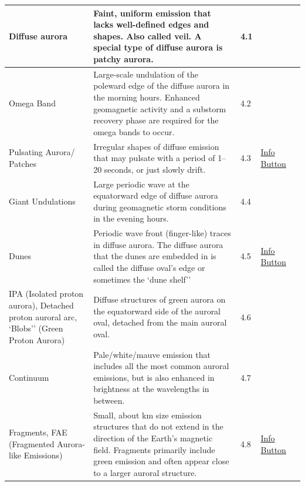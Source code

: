 \documentclass{article}
\begin{document}
\begin{longtable}{|p{1.5cm}|p{6.5cm}|p{1cm}|p{1.75cm}|p{1.8cm}|}
Diffuse aurora & Faint, uniform emission that lacks well-defined edges and shapes. Also called veil. A special type of diffuse aurora is patchy aurora. & 4.1 &  & \textcite{Nishimura2020} \\
\hline
Omega Band & Large-scale undulation of the poleward edge of the diffuse aurora in the morning hours. Enhanced geomagnetic activity and a substorm recovery phase are required for the omega bands to occur. & 4.2 &  & \textcite{Sato2017} \\
\hline
Pulsating Aurora/ Patches & Irregular shapes of diffuse emission that may pulsate with a period of 1--20 seconds, or just slowly drift. & 4.3 & \href{https://www.taivaanvahti.fi/observations/info/1031/en}{Info Button} & \textcite{Nishimura2020} \\
\hline
Giant Undulations & Large periodic wave at the equatorward edge of diffuse aurora during geomagnetic storm conditions in the evening hours. & 4.4 &  & \textcite{Zou2021} \\
\hline
Dunes & Periodic wave front (finger-like) traces in diffuse aurora. The diffuse aurora that the dunes are embedded in is called the diffuse oval's edge or sometimes the `dune shelf'' & 4.5 & \href{https://www.taivaanvahti.fi/observations/info/546/en}{Info Button} & \textcite{Palmroth2020}\\
\hline
IPA (Isolated proton aurora), Detached proton auroral arc, `Blobs'' (Green Proton Aurora) & Diffuse structures of green aurora on the equatorward side of the auroral oval, detached from the main auroral oval. & 4.6 &  & \textcite{Liang2022} \\
\hline
Continuum & Pale/white/mauve emission that includes all the most common auroral emissions, but is also enhanced in brightness at the wavelengths in between. & 4.7 &  & \textcite{Gillies2019} \\
\hline
Fragments, FAE (Fragmented Aurora-like Emissions) & Small, about km size emission structures that do not extend in the direction of the Earth's magnetic field. Fragments primarily include green emission and often appear close to a larger auroral structure. & 4.8 & \href{https://www.taivaanvahti.fi/observations/info/1031/en}{Info Button} & \textcite{Dreyer2021}\\
\hline


\end{longtable}
\end{document}
